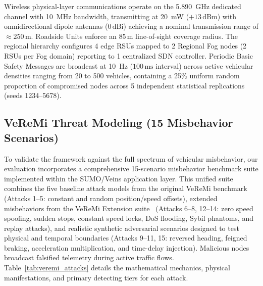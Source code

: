 \documentclass[conference]{IEEEtran}
\begin{document}
Wireless physical-layer communications operate on the 5.890~GHz dedicated channel with 10~MHz bandwidth, transmitting at 20~mW ($+13\,\text{dBm}$) with omnidirectional dipole antennas ($0\,\text{dBi}$) achieving a nominal transmission range of $\approx 250\,\text{m}$. Roadside Units enforce an $85\,\text{m}$ line-of-sight coverage radius. The regional hierarchy configures 4 edge RSUs mapped to 2 Regional Fog nodes (2 RSUs per Fog domain) reporting to 1 centralized SDN controller. Periodic Basic Safety Messages are broadcast at 10~Hz ($100\,\text{ms}$ interval) across active vehicular densities ranging from 20 to 500 vehicles, containing a 25\% uniform random proportion of compromised nodes across 5 independent statistical replications (seeds 1234--5678).

\subsection{VeReMi Threat Modeling (15 Misbehavior Scenarios)}

To validate the framework against the full spectrum of vehicular misbehavior, our evaluation incorporates a comprehensive 15-scenario misbehavior benchmark suite implemented within the SUMO/Veins application layer. This unified suite combines the five baseline attack models from the original VeReMi benchmark~\cite{veremi} (Attacks 1--5: constant and random position/speed offsets), extended misbehaviors from the VeReMi Extension suite~\cite{kamel2020veremi} (Attacks 6--8, 12--14: zero speed spoofing, sudden stops, constant speed locks, DoS flooding, Sybil phantoms, and replay attacks), and realistic synthetic adversarial scenarios designed to test physical and temporal boundaries (Attacks 9--11, 15: reversed heading, feigned braking, acceleration multiplication, and time-delay injection). Malicious nodes broadcast falsified telemetry during active traffic flows. Table~\ref{tab:veremi_attacks} details the mathematical mechanics, physical manifestations, and primary detecting tiers for each attack.
\end{document}
